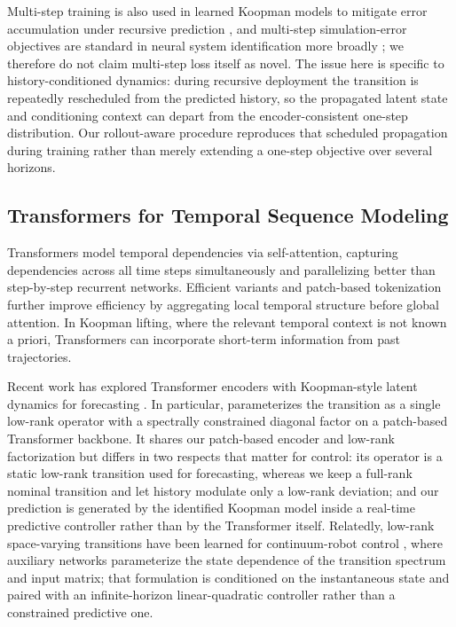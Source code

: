 Multi-step training is also used in learned Koopman models to mitigate error accumulation under recursive prediction \cite{lusch2018deep, otto2019linearly, azencot2020forecasting, wu2026multistep}, and multi-step simulation-error objectives are standard in neural system identification more broadly \cite{forgione2021dynonet}; we therefore do not claim multi-step loss itself as novel. The issue here is specific to history-conditioned dynamics: during recursive deployment the transition is repeatedly rescheduled from the predicted history, so the propagated latent state and conditioning context can depart from the encoder-consistent one-step distribution. Our rollout-aware procedure reproduces that scheduled propagation during training rather than merely extending a one-step objective over several horizons.

\subsection{Transformers for Temporal Sequence Modeling}

Transformers \cite{vaswani2017attention} model temporal dependencies via self-attention, capturing dependencies across all time steps simultaneously and parallelizing better than step-by-step recurrent networks. Efficient variants and patch-based tokenization \cite{zhou2021informer, wang2020linformer, choromanski2021performer, wu2021autoformer, zhou2022fedformer, nie2023time} further improve efficiency by aggregating local temporal structure before global attention. In Koopman lifting, where the relevant temporal context is not known a priori, Transformers can incorporate short-term information from past trajectories.

Recent work has explored Transformer encoders with Koopman-style latent dynamics for forecasting \cite{forootani2026deepkoopformer, forootani2026spectral}. In particular, \cite{forootani2026spectral} parameterizes the transition as a single low-rank operator with a spectrally constrained diagonal factor on a patch-based Transformer backbone. It shares our patch-based encoder and low-rank factorization but differs in two respects that matter for control: its operator is a static low-rank transition used for forecasting, whereas we keep a full-rank nominal transition and let history modulate only a low-rank deviation; and our prediction is generated by the identified Koopman model inside a real-time predictive controller rather than by the Transformer itself. Relatedly, low-rank space-varying transitions have been learned for continuum-robot control \cite{feizi2025deepkoopman}, where auxiliary networks parameterize the state dependence of the transition spectrum and input matrix; that formulation is conditioned on the instantaneous state and paired with an infinite-horizon linear-quadratic controller rather than a constrained predictive one.

